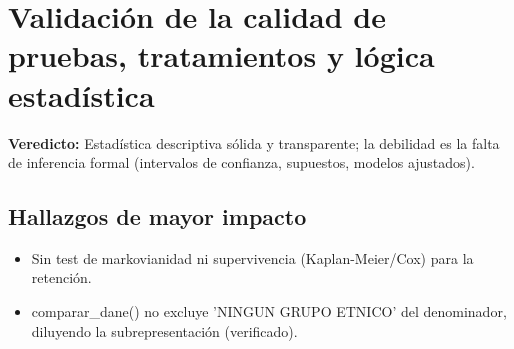 \section{Validación de la calidad de pruebas, tratamientos y lógica estadística}

\begin{tcolorbox}[hallazgo]
\textbf{Veredicto:} Estadística descriptiva sólida y transparente; la debilidad es la falta de inferencia formal (intervalos de confianza, supuestos, modelos ajustados).

\end{tcolorbox}

\subsection{Hallazgos de mayor impacto}

\begin{itemize}
  \item Sin test de markovianidad ni supervivencia (Kaplan-Meier/Cox) para la retención.
  \item comparar\_dane() no excluye 'NINGUN GRUPO ETNICO' del denominador, diluyendo la subrepresentación (verificado).
\end{itemize}
